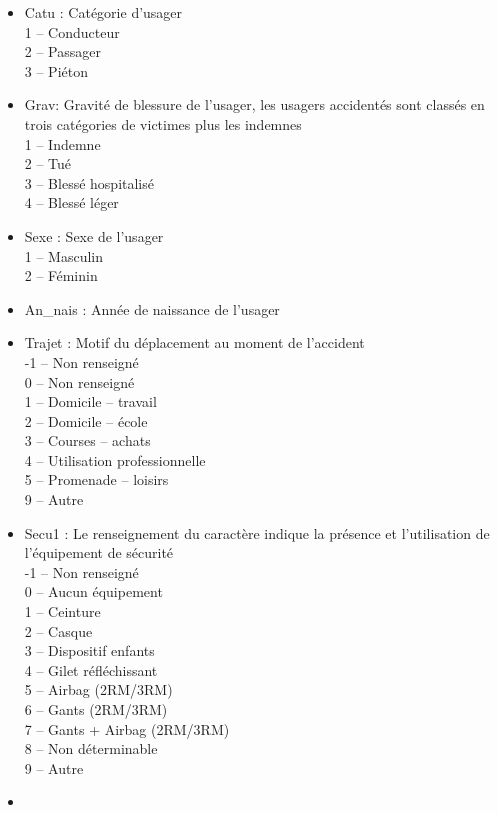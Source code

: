 \documentclass[french,]{tp}
\begin{document}
\begin{itemize}
  \begin{itemize}
  \item
    Catu : Catégorie d'usager\\
    1 -- Conducteur\\
    2 -- Passager\\
    3 -- Piéton
  \item
    Grav: Gravité de blessure de l'usager, les usagers accidentés sont classés en trois catégories de victimes plus les indemnes\\
    1 -- Indemne\\
    2 -- Tué\\
    3 -- Blessé hospitalisé\\
    4 -- Blessé léger
  \item
    Sexe : Sexe de l'usager\\
    1 -- Masculin\\
    2 -- Féminin
  \item
    An\_nais : Année de naissance de l'usager
  \item
    Trajet : Motif du déplacement au moment de l'accident\\
    -1 -- Non renseigné\\
    0 -- Non renseigné\\
    1 -- Domicile -- travail\\
    2 -- Domicile -- école\\
    3 -- Courses -- achats\\
    4 -- Utilisation professionnelle\\
    5 -- Promenade -- loisirs\\
    9 -- Autre
  \item
    Secu1 :
    Le renseignement du caractère indique la présence et l'utilisation de l'équipement de sécurité\\
    -1 -- Non renseigné\\
    0 -- Aucun équipement\\
    1 -- Ceinture\\
    2 -- Casque\\
    3 -- Dispositif enfants\\
    4 -- Gilet réfléchissant\\
    5 -- Airbag (2RM/3RM)\\
    6 -- Gants (2RM/3RM)\\
    7 -- Gants + Airbag (2RM/3RM)\\
    8 -- Non déterminable\\
    9 -- Autre
  \item

\end{itemize}
\end{itemize}
\end{document}
